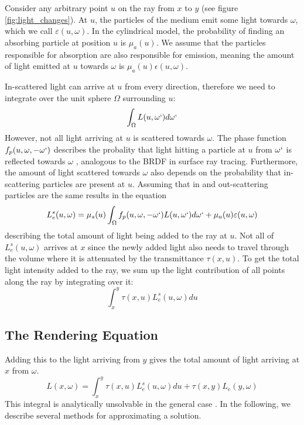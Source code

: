 Consider any arbitrary point ${u}$ on the ray from ${x}$ to ${y}$ (see figure \ref{fig:light_changes}).
At ${u}$, the particles of the medium emit some light towards $\omega$\cite{468400}, which we call $\varepsilon ({u}, \omega )$. In the cylindrical model, the probability of finding an absorbing particle at position ${u}$ is ${\mu}_a({u})$. We assume that the particles responsible for absorption are also responsible for emission\cite{468400}, meaning the amount of light emitted at ${u}$ towards $\omega$ is ${\mu}_a({u})\epsilon ({u}, \omega )$.

In-scattered light can arrive at ${u}$ from every direction, therefore we need to integrate over the unit sphere $\Omega$ surrounding ${u}$\cite{10.1145/280814.280925}:
\begin{equation}
\int_{\Omega} L({u}, \omega `)d\omega `
\end{equation}
However, not all light arriving at ${u}$ is scattered towards $\omega $. The phase function $f_p({u}, \omega , -\omega `)$ describes the probality that light hitting a particle at ${u}$ from $\omega `$ is reflected towards $\omega$ \cite{10.1145/280814.280925, Cerezo2005}, analogous to the BRDF \cite{10.1145/965141.563893} in surface ray tracing. Furthermore, the amount of light scattered towards $\omega $ also depends on the probability that in-scattering particles are present at ${u}$\cite{10.1145/280814.280925}. Assuming that in and out-scattering particles are the same results in the equation
\begin{equation}
L_e^s({u}, \omega ) = {\mu}_s({u})\int_{\Omega} f_p({u}, \omega , -\omega `)L({u}, \omega `)d\omega `  + {\mu}_a({u})\varepsilon ({u}, \omega )
\end{equation}
describing the total amount of light being added to the ray at ${u}$.
Not all of $L_e^s({u}, \omega )$ arrives at ${x}$ since the newly added light also needs to travel through the volume where it is attenuated by the transmittance $\tau ({x}, {u})$.
To get the total light intensity added to the ray, we sum up the light contribution of all points along the ray by integrating over it\cite{zhou2007real-time}:
\begin{equation}
\int_{{x}}^{{y}} \tau({x}, {u})L_e^s({u}, \omega )d{u}
\end{equation}
\subsection{The Rendering Equation}
Adding this to the light arriving from ${y}$ gives the total amount of light arriving at ${x}$ from $\omega $.
\begin{equation}
L({x}, \omega ) = {\int_{{x}}^{{y}} \tau({x}, {u})L_e^s({u}, \omega )d{u}} + \tau({x}, {y}) L_e({y}, \omega )
\end{equation}
This integral is analytically unsolvable in the general case \cite{10.1145/964965.808594}.
In the following, we describe several methods for approximating a solution.











